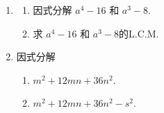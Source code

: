 \documentclass[11pt]{article}
\begin{document}
\begin{enumerate}
            \hrulefill
            
            \hrulefill
            
            \hrulefill
            
            \hrulefill
            
            \hrulefill
            
            \hrulefill

        \pagebreak
        \item \begin{enumerate}
            \item 因式分解 $a^4-16$ 和 $a^3-8$.
            \item 求 $a^4-16$ 和 $a^3-8$的L.C.M.
        \end{enumerate}
        \hrulefill
            
            \hrulefill
            
            \hrulefill
            
            \hrulefill
            
            \hrulefill
            
            \hrulefill
            
            \hrulefill
            
            \hrulefill
            
            \hrulefill
            
            \hrulefill
            
            \hrulefill
            
            \hrulefill
            
            \hrulefill
            
            \hrulefill
            
        \item 因式分解\begin{enumerate}
            \item $m^2+12mn+36n^2$.
            \item $m^2+12mn+36n^2-s^2$.
        \end{enumerate}
        \hrulefill
            
            \hrulefill
            
            \hrulefill
            
            \hrulefill
            
            \hrulefill
            
            \hrulefill
            

\end{enumerate}
\end{document}
